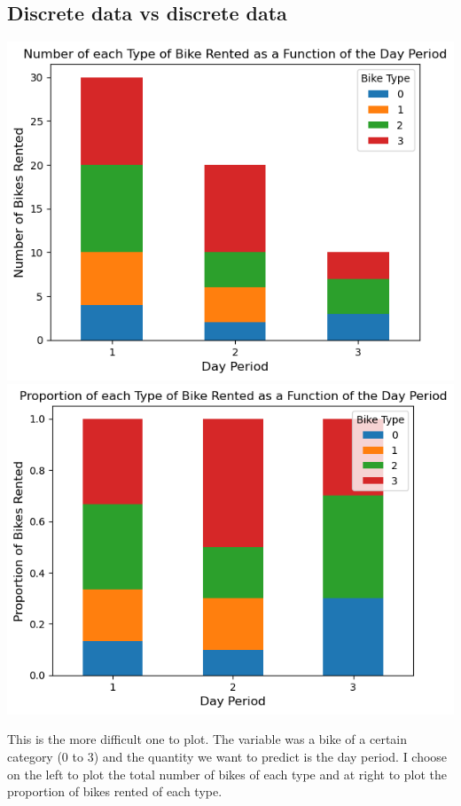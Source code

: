 \documentclass[24pt]{article}
\begin{document}
\subsection{Discrete data vs discrete data}
\begin{center}
\includegraphics[scale = 0.5]{discrete_vs_discrete_0.png}
\includegraphics[scale = 0.5]{discrete_vs_discrete.png}
\end{center}
This is the more difficult one to plot. The variable was a bike of a certain category (0 to 3) and the quantity we want to predict is the day period. I choose on the left to plot the total number of bikes of each type and at right to plot the proportion of bikes rented of each type.
\end{document}
